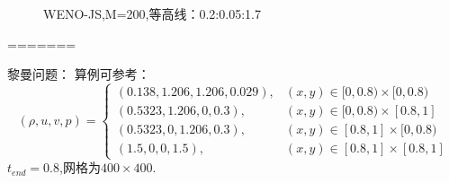 \documentclass{book}
\begin{document}
\begin{example}
\begin{example}{}{}
\begin{example}
\begin{example}
\begin{example}
\begin{figure}[ht]%
    \centering
    \quad
    \caption{WENO-JS,M=200,等高线：0.2:0.05:1.7}
\end{figure}
=======
\begin{example}{}{}黎曼问题：
    算例可参考：\cite{RN114}
    \begin{equation}
        (\rho, u, v, p)=\begin{cases}
            (0.138,1.206,1.206,0.029), & (x, y) \in[0,0.8) \times[0,0.8) \\
            (0.5323,1.206,0,0.3),      & (x, y) \in[0,0.8) \times[0.8,1] \\
            (0.5323,0,1.206,0.3),      & (x, y) \in[0.8,1] \times[0,0.8) \\
            (1.5,0,0,1.5),             & (x, y) \in[0.8,1] \times[0.8,1]
        \end{cases}
    \end{equation}
    $t_{end}=0.8$,网格为$400\times400$.


\end{example}
\end{example}
\end{example}
\end{example}
\end{example}
\end{example}
\end{document}
